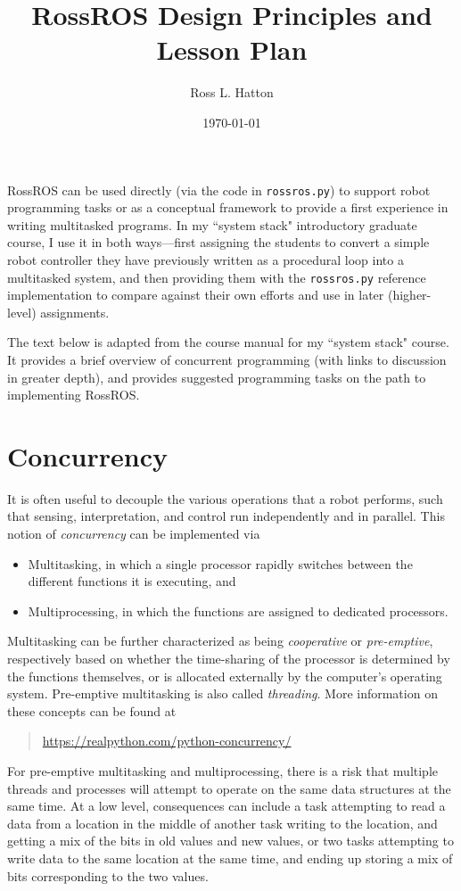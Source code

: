 \documentclass[11pt]{article}
\newcommand{\qurl}[1]{\begin{quote} \url{#1} \end{quote}}
\begin{document}
\lstset{basicstyle=\ttfamily,breaklines=true}

\sloppy

\title{RossROS Design Principles and Lesson Plan}
\author{Ross L. Hatton}
\date{\today}
\maketitle

RossROS can be used directly (via the code in \verb#rossros.py#) to support robot programming tasks or as a conceptual framework to provide a first experience in writing multitasked programs. In my ``system stack" introductory graduate course, I use it in both ways---first assigning the students to convert a simple robot controller they have previously written as a procedural loop into a multitasked system, and then providing them with the \verb#rossros.py# reference implementation to compare against their own efforts and use in later (higher-level) assignments.

The text below is adapted from the course manual for my ``system stack" course. It provides a brief overview of concurrent programming (with links to discussion in greater depth), and provides suggested programming tasks on the path to implementing RossROS.

\section{Concurrency}
It is often useful to decouple the various operations that a robot performs, such that sensing, interpretation, and control run independently and in parallel. This notion of \emph{concurrency} can be implemented via 
\begin{itemize}
\item Multitasking, in which a single processor rapidly switches between the different functions it is executing, and
\item Multiprocessing, in which the functions are assigned to dedicated processors.
\end{itemize}
Multitasking can be further characterized as being \emph{cooperative} or \emph{pre-emptive}, respectively based on whether the time-sharing of the processor is determined by the functions themselves, or is allocated externally by the computer's operating system. Pre-emptive multitasking is also called \emph{threading}. More information on these concepts can be found at \qurl{https://realpython.com/python-concurrency/}

For pre-emptive multitasking and multiprocessing, there is a risk that multiple threads and processes will attempt to operate on the same data structures at the same time. At a low level, consequences can include a task attempting to read a data from a location in the middle of another task writing to the location, and getting a mix of the bits in old values and new values, or two tasks attempting to write data to the same location at the same time, and ending up storing a mix of bits corresponding to the two values.
\end{document}
